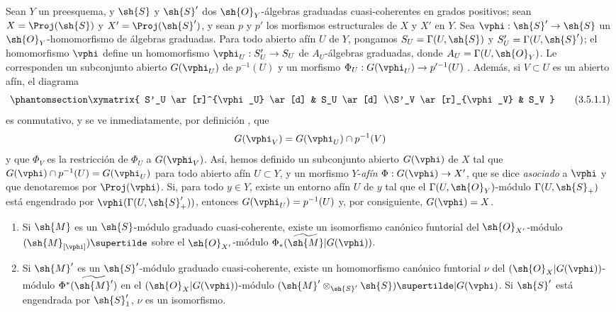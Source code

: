 \documentclass[oneside,10pt]{amsart}
\makeatletter
\newcommand{\ega@arrow}[2]{\mathchoice{#1}{#2}{#2}{#2}}
\renewcommand{\to}{\ega@arrow{\longrightarrow}{\rightarrow}}
\newcommand{\oldpage}[2][]{\marginnote{\normalfont\footnotesize\textbf{#1}~|~#2}\ignorespaces}
\let\EGAOriginalLabel\label
\renewcommand{\label}[1]{\phantomsection\EGAOriginalLabel{#1}}
\makeatother
\begin{document}
\begin{env}[3.5.1]
\label{II.3.5.1}
Sean $Y$ un preesquema, y $\sh{S}$ y $\sh{S}'$ dos $\sh{O}_Y$-álgebras graduadas cuasi-coherentes en grados positivos; sean $X=\Proj(\sh{S})$ y $X'=\Proj(\sh{S}')$, y sean $p$ y $p'$ los morfismos estructurales de $X$ y $X'$ en $Y$.
Sea $\vphi:\sh{S}'\to\sh{S}$ un $\sh{O}_Y$-homomorfismo de álgebras graduadas.
Para todo abierto afín $U$ de $Y$, pongamos $S_U=\Gamma(U,\sh{S})$ y $S'_U=\Gamma(U,\sh{S}')$; el homomorfismo $\vphi$ define un homomorfismo $\vphi_U:S'_U\to S_U$ de $A_U$-álgebras graduadas, donde $A_U=\Gamma(U,\sh{O}_Y)$.
Le corresponden un subconjunto abierto $G(\vphi_U)$ de $p^{-1}(U)$ y un morfismo $\Phi_U:G(\vphi_U)\to p'^{-1}(U)$ .
Además, si $V\subset U$ es un abierto afín, el diagrama
\[
\label{II.3.5.1.1}
  \xymatrix{
    S'_U \ar[r]^{\vphi_U} \ar[d]
    & S_U \ar[d]
  \\S'_V \ar[r]_{\vphi_V}
    & S_V
  }
\tag{3.5.1.1}
\]
es conmutativo, y se ve inmediatamente, por definición , que
\[
  G(\vphi_V)=G(\vphi_U)\cap p^{-1}(V)
\]
y que $\Phi_V$ es la restricción de $\Phi_U$ a $G(\vphi_V)$.
Así, hemos definido un subconjunto abierto $G(\vphi)$ de $X$ tal que $G(\vphi)\cap p^{-1}(U)=G(\vphi_U)$ para todo abierto afín $U\subset Y$, y un morfismo $Y$-\emph{afín} $\Phi:G(\vphi)\to X'$, que se dice \emph{asociado} a $\vphi$ y que denotaremos por $\Proj(\vphi)$.
\oldpage[II]{62}
Si, para todo $y\in Y$, existe un entorno afín $U$ de $y$ tal que el $\Gamma(U,\sh{O}_Y)$-módulo $\Gamma(U,\sh{S}_+)$ está engendrado por $\vphi(\Gamma(U,\sh{S}'_+))$, entonces $G(\vphi_U)=p^{-1}(U)$ y, por consiguiente, $G(\vphi)=X$.
\end{env}

\begin{proposition}[3.5.2]
\label{II.3.5.2}
\medskip\noindent
\begin{enumerate}
  \item[(i)] Si $\sh{M}$ es un $\sh{S}$-módulo graduado cuasi-coherente, existe un isomorfismo canónico funtorial del $\sh{O}_{X'}$-módulo $(\sh{M}_{[\vphi]})\supertilde$ sobre el $\sh{O}_{X'}$-módulo $\Phi_*(\widetilde{\sh{M}}|G(\vphi))$.
  \item[(ii)] Si $\sh{M}'$ es un $\sh{S}'$-módulo graduado cuasi-coherente, existe un homomorfismo canónico funtorial $\nu$ del $(\sh{O}_X|G(\vphi))$-módulo $\Phi^*(\widetilde{\sh{M}'})$ en el $(\sh{O}_X|G(\vphi))$-módulo $(\sh{M}'\otimes_{\sh{S}'}\sh{S})\supertilde|G(\vphi)$.
    Si $\sh{S}'$ está engendrada por $\sh{S}'_1$, $\nu$ es un isomorfismo.
\end{enumerate}
\end{proposition}
\end{document}
